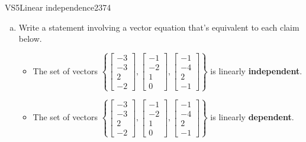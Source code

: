 \begin{exercise}{VS5}{Linear independence}{2374} 
\begin{exerciseStatement} 

\begin{enumerate}[(a)]
\item  

 Write a statement involving a vector equation that's equivalent to each claim below. 

 

\begin{itemize}
\item  

 The set of vectors \(\left\{ \left[\begin{array}{c}
-3 \\
-3 \\
2 \\
-2
\end{array}\right] , \left[\begin{array}{c}
-1 \\
-2 \\
1 \\
0
\end{array}\right] , \left[\begin{array}{c}
-1 \\
-4 \\
2 \\
-1
\end{array}\right] \right\}\) is linearly \textbf{independent}. 

 
\item  

 The set of vectors \(\left\{ \left[\begin{array}{c}
-3 \\
-3 \\
2 \\
-2
\end{array}\right] , \left[\begin{array}{c}
-1 \\
-2 \\
1 \\
0
\end{array}\right] , \left[\begin{array}{c}
-1 \\
-4 \\
2 \\
-1
\end{array}\right] \right\}\) is linearly \textbf{dependent}. 

 
\end{itemize}


\end{enumerate}
\end{exerciseStatement}
\end{exercise}
